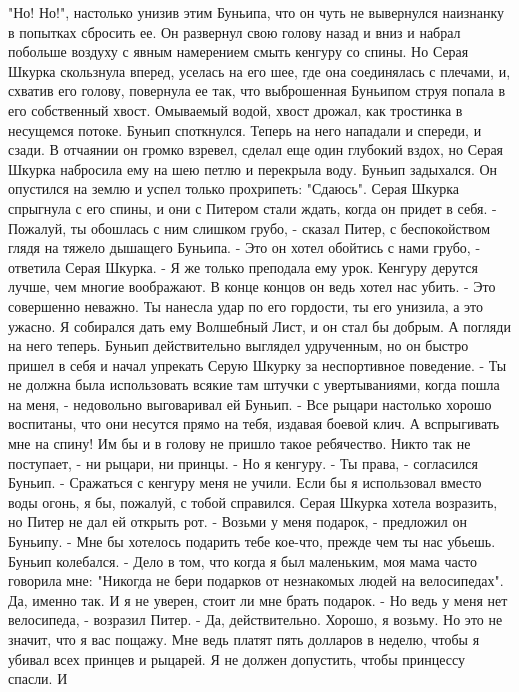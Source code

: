 "Но! Но!", настолько унизив этим Буньипа, что он чуть не вывернулся 
наизнанку в попытках сбросить ее. Он развернул свою голову назад и 
вниз и набрал побольше воздуху с явным намерением смыть кенгуру со 
спины. Но Серая Шкурка скользнула вперед, уселась на его шее, где она 
соединялась с плечами, и, схватив его голову, повернула ее так, что 
выброшенная Буньипом струя попала в его собственный хвост. Омываемый 
водой, хвост дрожал, как тростинка в несущемся потоке.
    Буньип споткнулся. Теперь на него нападали и спереди, и сзади. В 
отчаянии он громко взревел, сделал еще один глубокий вздох, но Серая 
Шкурка набросила ему на шею петлю и перекрыла воду. Буньип задыхался. 
Он опустился на землю и успел только прохрипеть: "Сдаюсь".
    Серая Шкурка спрыгнула с его спины, и они с Питером стали ждать, 
когда он придет в себя.
    - Пожалуй, ты обошлась с ним слишком грубо, - сказал Питер, с 
беспокойством глядя на тяжело дышащего Буньипа.
    - Это он хотел обойтись с нами грубо, - ответила Серая Шкурка. - Я 
же только преподала ему урок. Кенгуру дерутся лучше, чем многие 
воображают. В конце концов он ведь хотел нас убить.
    - Это совершенно неважно. Ты нанесла удар по его гордости, ты его 
унизила, а это ужасно. Я собирался дать ему Волшебный Лист, и он стал 
бы добрым. А погляди на него теперь.
    Буньип действительно выглядел удрученным, но он быстро пришел в 
себя и начал упрекать Серую Шкурку за неспортивное поведение.
    - Ты не должна была использовать всякие там штучки с 
увертываниями, когда пошла на меня, - недовольно выговаривал ей 
Буньип. - Все рыцари настолько хорошо воспитаны, что они несутся прямо 
на тебя, издавая боевой клич. А вспрыгивать мне на спину! Им бы и в 
голову не пришло такое ребячество. Никто так не поступает, - ни 
рыцари, ни принцы.
    - Но я кенгуру.
    - Ты права, - согласился Буньип. - Сражаться с кенгуру меня не 
учили. Если бы я использовал вместо воды огонь, я бы, пожалуй, с тобой 
справился.
    Серая Шкурка хотела возразить, но Питер не дал ей открыть рот.
    - Возьми у меня подарок, - предложил он Буньипу. - Мне бы хотелось 
подарить тебе кое-что, прежде чем ты нас убьешь.
    Буньип колебался.
    - Дело в том, что когда я был маленьким, моя мама часто говорила 
мне: "Никогда не бери подарков от незнакомых людей на велосипедах". 
Да, именно так. И я не уверен, стоит ли мне брать подарок.
    - Но ведь у меня нет велосипеда, - возразил Питер.
    - Да, действительно. Хорошо, я возьму. Но это не значит, что я вас 
пощажу. Мне ведь платят пять долларов в неделю, чтобы я убивал всех 
принцев и рыцарей. Я не должен допустить, чтобы принцессу спасли. И 
